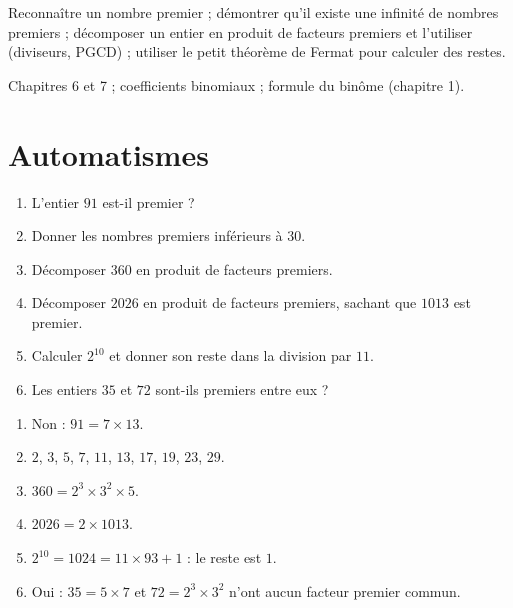 
\begin{objectives}
Reconnaître un nombre premier ; démontrer qu'il existe une infinité de nombres premiers ; décomposer un entier en produit de facteurs premiers et l'utiliser (diviseurs, PGCD) ; utiliser le petit théorème de Fermat pour calculer des restes.
\end{objectives}
\begin{prerequisites}
Chapitres 6 et 7 ; coefficients binomiaux ; formule du binôme (chapitre 1).
\end{prerequisites}

\section{Automatismes}
\begin{fluency}
\begin{enumerate}
\item L'entier $91$ est-il premier ?
\item Donner les nombres premiers inférieurs à $30$.
\item Décomposer $360$ en produit de facteurs premiers.
\item Décomposer $\num{2026}$ en produit de facteurs premiers, sachant que $\num{1013}$ est premier.
\item Calculer $2^{10}$ et donner son reste dans la division par $11$.
\item Les entiers $35$ et $72$ sont-ils premiers entre eux ?
\end{enumerate}
\end{fluency}
\begin{solution}[Automatismes]
\begin{enumerate}
\item Non : $91=7\times13$.
\item $2$, $3$, $5$, $7$, $11$, $13$, $17$, $19$, $23$, $29$.
\item $360=2^3\times3^2\times5$.
\item $\num{2026}=2\times\num{1013}$.
\item $2^{10}=\num{1024}=11\times93+1$ : le reste est $1$.
\item Oui : $35=5\times7$ et $72=2^3\times3^2$ n'ont aucun facteur premier commun.
\end{enumerate}
\end{solution}

